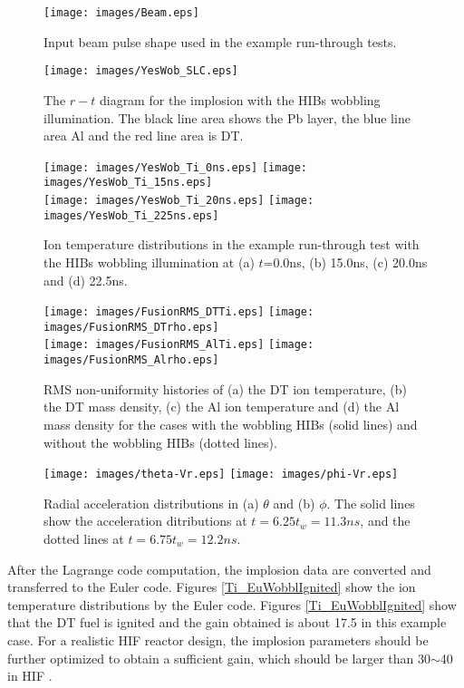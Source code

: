\begin{figure}[H]
		\centering
		\texttt{[image: images/Beam.eps]}
		\caption{Input beam pulse shape used in the example run-through tests.}\label{Beam}
\end{figure}
\begin{figure}[H]
		\centering
		\texttt{[image: images/YesWob\_SLC.eps]}
		\caption{The $r-t$ diagram for the implosion with the HIBs wobbling illumination. The black line area shows the Pb layer, the blue line area Al and the red line area is DT.}\label{rt}
\end{figure}
\begin{figure}[H]
		\centering
		\texttt{[image: images/YesWob\_Ti\_0ns.eps]}
		\texttt{[image: images/YesWob\_Ti\_15ns.eps]}\\
		\texttt{[image: images/YesWob\_Ti\_20ns.eps]}
		\texttt{[image: images/YesWob\_Ti\_225ns.eps]}\\
		\caption{Ion temperature distributions in the example run-through test with the HIBs wobbling illumination at (a) $t$=0.0ns, (b) 15.0ns, (c) 20.0ns and (d) 22.5ns.}\label{fusion_Ti}
\end{figure}
\begin{figure}[H]
		\centering
		\texttt{[image: images/FusionRMS\_DTTi.eps]}
		\texttt{[image: images/FusionRMS\_DTrho.eps]}\\
		\texttt{[image: images/FusionRMS\_AlTi.eps]}
		\texttt{[image: images/FusionRMS\_Alrho.eps]}\\
		\caption{RMS non-uniformity histories of (a) the DT ion temperature, (b) the DT mass density, (c) the Al ion temperature and (d) the Al mass density for the cases with the wobbling HIBs (solid lines) and without the wobbling HIBs (dotted lines).}\label{fusion_RMS}
\end{figure}
%
\begin{figure}[H]
		\centering
		\texttt{[image: images/theta-Vr.eps]}
		\texttt{[image: images/phi-Vr.eps]}\\
		\caption{Radial acceleration distributions in (a) $\theta$ and (b) $\phi$. The solid lines show the acceleration ditributions at $t=6.25t_w=11.3ns$, and the dotted lines at $t=6.75t_w=12.2ns$.}\label{Vr_tp}
\end{figure}
%

After the Lagrange code computation, the implosion data are converted and transferred to the Euler code. Figures \ref{Ti_EuWobblIgnited} show the ion temperature distributions by the Euler code. Figures \ref{Ti_EuWobblIgnited} show that the DT fuel is ignited and the gain obtained is about 17.5 in this example case. For a realistic HIF reactor design, the implosion parameters should be further optimized to obtain a sufficient gain, which should be larger than 30$\sim$40 in HIF \cite{CPC-O-SUKI, Kawata1, Kawata2, RSato2}. 


